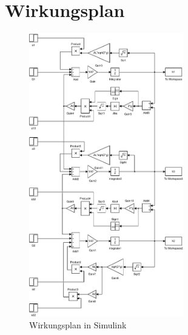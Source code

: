 \section{Wirkungsplan}
\begin{figure}[h!]
    \centering
    \includegraphics[width=0.6\textwidth]{03/wirkungsplan_mdl.pdf}
    \caption{Wirkungsplan in Simulink}
    \label{fig:03_mdl}
\end{figure}

